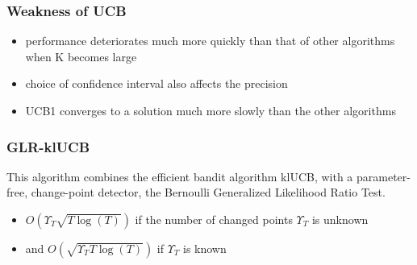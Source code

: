 \documentclass{beamer}
\begin{document}
    \begin{frame}
        \frametitle{Weakness of UCB}

        \begin{itemize}
            \item<1->  performance deteriorates much more quickly than that of other algorithms when K becomes large \footnotemark[1]
            \item<2->  choice of confidence interval also affects the precision
            \item<3->  UCB1 converges to a solution much more slowly than the other algorithms \footnotemark[2]
        \end{itemize}
    \end{frame}


    \begin{frame}
        \frametitle{GLR-klUCB}
        This algorithm combines the efficient bandit algorithm klUCB, with a parameter- free, change-point detector, the Bernoulli Generalized Likelihood Ratio Test.\footnotemark[1]
        \begin{itemize}
            \item<1->  $ O\left(\Upsilon_T \sqrt{T \log\left(T\right)} \right)$ if the number of changed points $\Upsilon_T $ is unknown
            \item<2->   and $ O\left(\sqrt{\Upsilon_T T \log\left(T\right)} \right)$ if  $\Upsilon_T $ is known

        \end{itemize}
    \end{frame}
\end{document}
